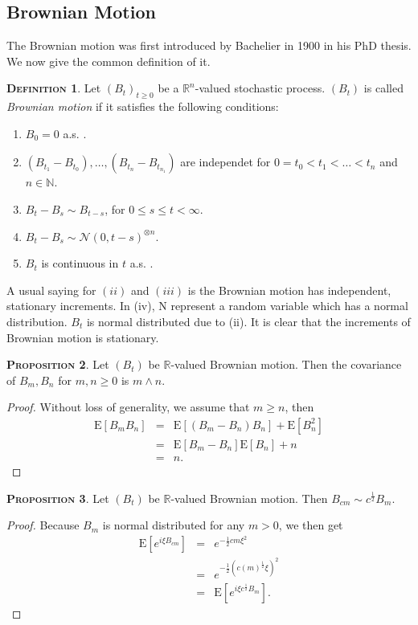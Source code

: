 \documentclass[a4paper, twoside, 11pt]{article}
\theoremstyle{definition}
\newtheorem{definition}{\scshape Definition}[section]
\newtheorem{proposition}[definition]{\scshape Proposition}
\begin{document}
\subsection{Brownian Motion}
The Brownian motion was first introduced by Bachelier in 1900 in his PhD thesis. We now give the common definition of it.
\begin{definition}
Let $(B_t)_{t\ge0}$ be a $\mathbb{R}^{n}$-valued stochastic process. $(B_t)$ is called \emph{Brownian motion} if it satisfies the following conditions:
\begin{enumerate}[topsep=0pt, itemsep=-1ex, partopsep=1ex, parsep=1ex, label=(\roman*)]
  \item $B_0 = 0 $ a.s. .
  \item $(B_{t_1} - B_{t_0}),\dots,(B_{t_n} - B_{t_{n_1}})$ are independet for $0=t_0<t_1<\dots<t_n$ and $n \in \mathbb{N}$.
  \item $B_t - B_s \sim B_{t-s}$, for $0 \le s \le t < \infty$.
  \item $B_t - B_s \sim \mathcal{N}(0, t-s)^{\otimes n}$.
  \item $B_t$ is continuous in $t$ a.s. .
\end{enumerate}
\end{definition}
A usual saying for $(ii)$ and $(iii)$ is the Brownian motion has independent, stationary increments. In (iv), $\mathrm{N}$ represent a random variable which has a normal distribution. $B_t$ is normal distributed due to (ii). It is clear that the increments of Brownian motion is stationary.

\begin{proposition}
  Let $(B_t)$ be $\mathbb{R}$-valued Brownian motion. Then the covariance of $B_m, B_n$ for $m, n \ge 0$ is $m \wedge n $.
\end{proposition}
\begin{proof}
  Without loss of generality, we assume that $m \ge n$, then
  \begin{eqnarray*}
	\mathrm{E}[B_mB_n] &=& \mathrm{E}[(B_m - B_n)B_n] + \mathrm{E}[B_n^2]\\
	&=& \mathrm{E}[B_m - B_n]\mathrm{E}[B_n] + n\\
	&=& n .
  \end{eqnarray*}
  \label{sec:cor}
\end{proof}

\begin{proposition}
  Let $(B_t)$ be  $\mathbb{R}$-valued Brownian motion. Then $B_{cm} \sim c^{\frac{1}{2}}B_m$.
\end{proposition}
\begin{proof}
  Because $B_m$ is normal distributed for any $m > 0$, we then get
  \begin{eqnarray*}
	\mathrm{E} [e^{i\xi B_{cm}}] &=& e^{-\frac{1}{2}cm\xi^2}\\
	&=& e^{-\frac{1}{2}(c(m)^{\frac{1}{2}}\xi)^2}\\
	&=& \mathrm{E} [e^{i\xi c^{\frac{1}{2}}B_m}] .
  \end{eqnarray*}
\end{proof}
\end{document}
